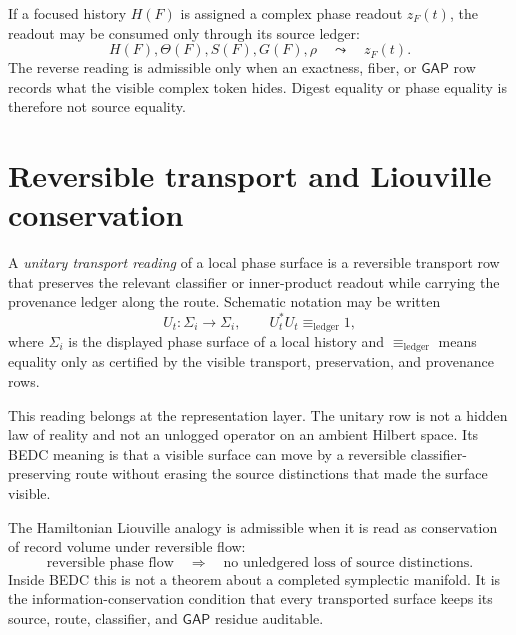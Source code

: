\begin{principle}
\label{prin:hyperbolic-phase-readout-not-source}
If a focused history $H(F)$ is assigned a complex phase readout $z_F(t)$, the readout may be consumed only through its source ledger:
$$
H(F),\Theta(F),S(F),G(F),\rho
\quad\leadsto\quad
z_F(t).
$$
The reverse reading is admissible only when an exactness, fiber, or $\mathsf{GAP}$ row records what the visible complex token hides. Digest equality or phase equality is therefore not source equality.
\end{principle}

\section{Reversible transport and Liouville conservation}
\label{sec:hyperbolic-reversible-liouville}

\begin{definition}
\label{def:hyperbolic-unitary-transport-reading}
A \emph{unitary transport reading} of a local phase surface is a reversible transport row that preserves the relevant classifier or inner-product readout while carrying the provenance ledger along the route. Schematic notation may be written
$$
U_t : \Sigma_i \to \Sigma_i,
\qquad
U_t^\ast U_t \equiv_{\mathrm{ledger}} 1,
$$
where $\Sigma_i$ is the displayed phase surface of a local history and $\equiv_{\mathrm{ledger}}$ means equality only as certified by the visible transport, preservation, and provenance rows.
\end{definition}

This reading belongs at the representation layer. The unitary row is not a hidden law of reality and not an unlogged operator on an ambient Hilbert space. Its BEDC meaning is that a visible surface can move by a reversible classifier-preserving route without erasing the source distinctions that made the surface visible.

\begin{principle}
\label{prin:hyperbolic-liouville-ledger-conservation}
The Hamiltonian Liouville analogy is admissible when it is read as conservation of record volume under reversible flow:
$$
\text{reversible phase flow}
\quad\Rightarrow\quad
\text{no unledgered loss of source distinctions}.
$$
Inside BEDC this is not a theorem about a completed symplectic manifold. It is the information-conservation condition that every transported surface keeps its source, route, classifier, and $\mathsf{GAP}$ residue auditable.
\end{principle}

